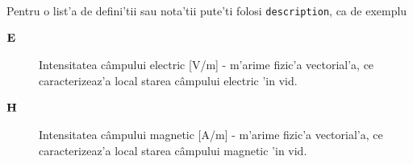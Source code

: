 Pentru o list'a de defini'tii sau nota'tii pute'ti folosi \verb|description|, ca de exemplu
\begin{description}
\item[$\mathbf{E}$]{Intensitatea c\^ampului electric [V/m] - m'arime fizic'a vectorial'a, ce caracterizeaz'a local starea c\^ampului electric 'in vid. }
\item[$\mathbf{H}$]{Intensitatea c\^ampului magnetic [A/m] - m'arime fizic'a vectorial'a, ce caracterizeaz'a local starea c\^ampului magnetic 'in vid. }
\end{description}


